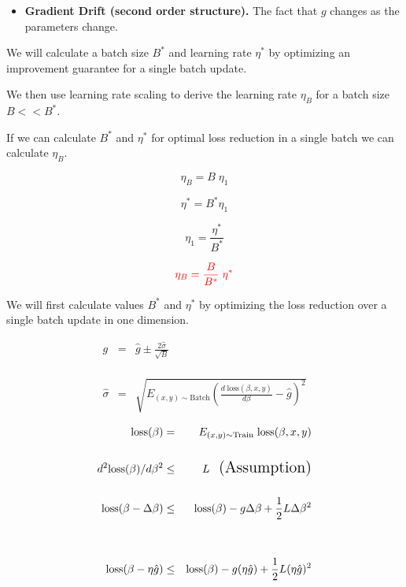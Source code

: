 {\begin{itemize}
  \vfill
\item {\bf Gradient Drift (second order structure).} The fact that $g$ changes as the parameters change.
\end{itemize}


We will calculate a batch size $B^*$ and learning rate $\eta^*$ by optimizing an improvement guarantee for a single batch update.

\vfill
We then use learning rate scaling to derive the learning rate  $\eta_B$ for a batch size $B << B^*$.


If we can calculate $B^*$ and $\eta^*$ for optimal loss reduction in a single batch
we can calculate $\eta_B$.

\vfill
$$\eta_B = B\;\eta_1$$

\vfill
$$\eta^* = B^* \eta_1$$

\vfill
$$\eta_1 = \frac{\eta^*}{B^*}$$

\vfill
$${\color{red} \eta_B = \frac{B}{B^*} \;\eta^*}$$


We will first calculate values $B^*$ and $\eta^*$ by optimizing the loss reduction over a single batch update in one dimension.

\vfill
\begin{eqnarray*}
  g & = & \hat{g} \pm \frac{2\hat{\sigma}}{\sqrt{B}} \\
  \\
  \\
  \\
  \hat{\sigma} & = & \sqrt{E_{(x,y) \sim \mathrm{Batch}} \left(\frac{d\;\mathrm{loss}(\beta,x,y)}{d \beta} - \hat{g}\right)^2}
\end{eqnarray*}


\begin{eqnarray*}
  \mathrm{loss}(\beta) & = & E_{(x,y) \sim \mathrm{Train}}\;\mathrm{loss}(\beta,x,y) \\
  \\
  d^2 \mathrm{loss}(\beta)/d \beta^2 & \leq & L \;\;\;\mbox{\Large (Assumption)} \\
  \\
  \mathrm{loss}(\beta - \Delta\beta) & \leq & \mathrm{loss}(\beta) - g\Delta \beta + \frac{1}{2}L\Delta \beta^2 \\
  \\
  \\
  \mathrm{loss}(\beta - \eta\hat{g}) & \leq & \mathrm{loss}(\beta) - g(\eta\hat{g}) + \frac{1}{2}L(\eta\hat{g})^2
\end{eqnarray*}

}
